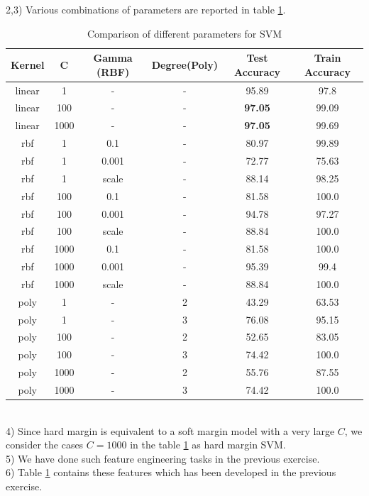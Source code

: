 \documentclass[11pt]{article}
\begin{document}
2,3) Various combinations of parameters are reported in table \ref{tbl:1}.
\begin{table}[]
\centering
\begin{tabular}{@{}cccccc@{}}
\toprule
\textbf{Kernel} & \textbf{C} & \textbf{Gamma (RBF)} & \textbf{Degree(Poly)} & \textbf{Test Accuracy} & \textbf{Train Accuracy} \\ \midrule
linear & 1 & - & - & 95.89 & 97.8 \\
linear & 100 & - & - & \textbf{97.05} & 99.09 \\
linear & 1000 & - & - & \textbf{97.05} & 99.69 \\
rbf & 1 & 0.1 & - & 80.97 & 99.89 \\
rbf & 1 & 0.001 & - & 72.77 & 75.63 \\
rbf & 1 & scale & - & 88.14 & 98.25 \\
rbf & 100 & 0.1 & - & 81.58 & 100.0 \\
rbf & 100 & 0.001 & - & 94.78 & 97.27 \\
rbf & 100 & scale & - & 88.84 & 100.0 \\
rbf & 1000 & 0.1 & - & 81.58 & 100.0 \\
rbf & 1000 & 0.001 & - & 95.39 & 99.4 \\
rbf & 1000 & scale & - & 88.84 & 100.0 \\
poly & 1 & - & 2 & 43.29 & 63.53 \\
poly & 1 & - & 3 & 76.08 & 95.15 \\
poly & 100 & - & 2 & 52.65 & 83.05 \\
poly & 100 & - & 3 & 74.42 & 100.0 \\
poly & 1000 & - & 2 & 55.76 & 87.55 \\
poly & 1000 & - & 3 & 74.42 & 100.0 \\ \bottomrule
\end{tabular}
\caption{Comparison of different parameters for SVM}
\label{tbl:1}
\end{table}
\\

4) Since hard margin is equivalent to a soft margin model with a very large $C$, we consider the cases $C=1000$ in the table \ref{tbl:1} as hard margin SVM.
\\

5) We have done such feature engineering tasks in the previous exercise. 
\\

6) Table \ref{tbl:1} contains these features which has been developed in the previous exercise.
\end{document}

